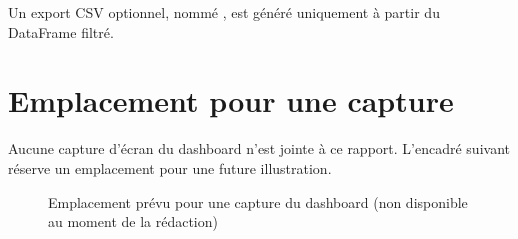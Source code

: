 Un export CSV optionnel, nommé , est généré uniquement à partir du DataFrame filtré.

\section{Emplacement pour une capture}

Aucune capture d'écran du dashboard n'est jointe à ce rapport. L'encadré suivant réserve un emplacement pour une future illustration.

\begin{figure}[H]
\centering
{}
\caption{Emplacement prévu pour une capture du dashboard (non disponible au moment de la rédaction)}
\label{fig:dashboard-placeholder}
\end{figure}

